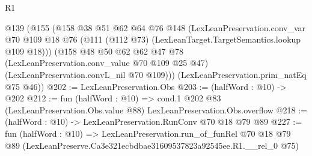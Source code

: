 \begin{lexlean}{R1}
\begin{coremodule}
  @139
    (@155
      (@158
        @38
        @51
        @62
        @64
        @76
        @148
        (LexLeanPreservation.conv_var
          @70
          @109
          @18
          @76
          (@111 (@112 @73) (LexLeanTarget.TargetSemantics.lookup @109 @18)))
        (@158
          @48
          @50
          @62
          @62
          @47
          @78
          (LexLeanPreservation.conv_value @70 @109 @25 @47)
          (LexLeanPreservation.convL_nil @70 @109)))
      (LexLeanPreservation.prim_natEq @75 @46))
@202 := LexLeanPreservation.Obs
@203 := (halfWord : @10) -> @202
@212 := fun (halfWord : @10) =>
  cond.{1} @202 @83 (LexLeanPreservation.Obs.value @88) LexLeanPreservation.Obs.overflow
@218 := (halfWord : @10) -> LexLeanPreservation.RunConv @70 @18 @79 @89
@227 := fun (halfWord : @10) =>
  LexLeanPreservation.run_of_funRel
    @70
    @18
    @79
    @89
    (LexLeanPreserve.Ca3e321ecbdbae31609537823a92545ee.R1.__rel_0 @75)
\end{coremodule}
\end{lexlean}

